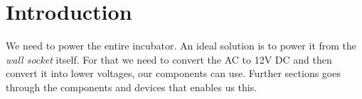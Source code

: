 \documentclass[../../main]{subfiles}
\begin{document}
\section{Introduction} \label{sec:}

We need to power the entire incubator. An ideal solution is to power
it from the \emph{wall socket} itself. For that we need to convert the
AC to 12V DC and then convert it into lower voltages, our components can
use. Further sections goes through the components and devices that enables
us this.
\end{document}
